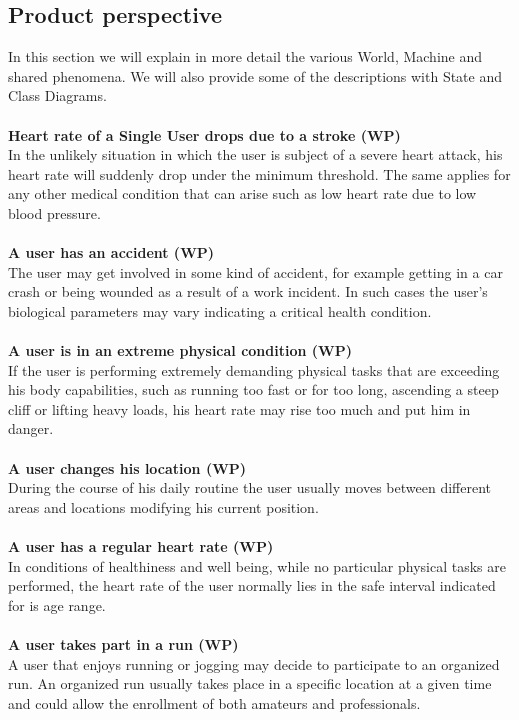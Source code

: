 \documentclass[titlepage]{article}
\begin{document}
	\subsection{Product perspective}
	In this section we will explain in more detail the various World, Machine and shared phenomena. We will also provide 	some of the descriptions with State and Class Diagrams.\\ \\
	{\bf Heart rate of a Single User drops due to a stroke (WP) }\\ 
	In the unlikely situation in which the user is subject of a severe heart attack, his heart rate will suddenly drop under the 	minimum threshold. The same applies for any other medical condition that can arise such as low heart rate due to low 	blood pressure.\\ \\
	{\bf A user has an accident (WP)}\\
	The user may get involved in some kind of accident, for example getting in a car crash or being wounded as a result of 	a work incident. In such cases the user’s biological parameters may vary indicating a critical health condition.\\ \\
	{\bf A user is in an extreme physical condition (WP)}\\
	If the user is performing extremely demanding physical tasks that are exceeding his body capabilities, such as running 	too fast or for too long, ascending a steep cliff or lifting heavy loads, his heart rate may rise too much and put him in 		danger.\\ \\
	{\bf A user changes his location (WP)} \\
	During the course of his daily routine the user usually moves between different areas and locations modifying his 		current position.\\ \\
	{\bf A user has a regular heart rate (WP)} \\ 
	In conditions of healthiness and well being, while no particular physical tasks are performed, the heart rate of the user 	normally lies in the safe interval indicated for is age range.\\ \\
	{\bf A user takes part in a run (WP)}\\
	A user that enjoys running or jogging may decide to participate to an organized run. An organized run usually takes 		place in a specific location at a given time and could allow the enrollment of both amateurs and professionals. \\ \\
\end{document}
